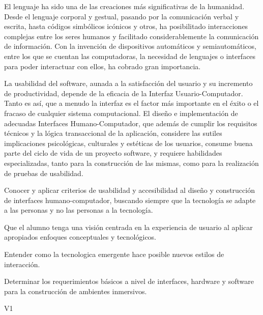 \begin{syllabus}


\begin{justification}
El lenguaje ha sido una de las creaciones más significativas de la humanidad. Desde el lenguaje corporal y gestual, 
pasando por la comunicación verbal y escrita, hasta códigos simbólicos icónicos y otros, ha posibilitado interacciones complejas 
entre los seres humanos y facilitado considerablemente la comunicación de información. 
Con la invención de dispositivos automáticos y semiautomáticos, entre los que se cuentan las computadoras, 
la necesidad de lenguajes o interfaces para poder interactuar con ellos, ha cobrado gran importancia. 

La usabilidad del software, aunada a la satisfacción del usuario y su incremento de productividad, depende de la eficacia de la Interfaz Usuario-Computador.
Tanto es así­, que a menudo la interfaz es el factor más importante en el éxito o el fracaso de cualquier sistema computacional. 
El diseño e implementación de adecuadas Interfaces Humano-Computador, que además de cumplir los requisitos técnicos y la 
lógica transaccional de la aplicación, considere las sutiles implicaciones psicológicas, culturales y estéticas de los usuarios, 
consume buena parte del ciclo de vida de un proyecto software, y requiere habilidades especializadas, 
tanto para la construcción de las mismas, como para la realización de pruebas de usabilidad.
\end{justification}

\begin{goals}
\item Conocer y aplicar criterios de usabilidad y accesibilidad al diseño y construcción de interfaces humano-computador, buscando siempre que la tecnología se adapte a las personas y no las personas a la tecnología.
\item Que el alumno tenga una visión centrada en la experiencia de usuario al aplicar apropiados enfoques conceptuales y tecnológicos.
\item Entender como la tecnologica emergente hace posible nuevos estilos de interacción. 
\item Determinar los requerimientos básicos a nivel de interfaces, hardware y software para la construcción de ambientes inmersivos.
\end{goals}

\begin{outcomes}{V1}
    \item {}
    \item {}
    \item {}
    \item {}
    \item {}
\end{outcomes}


\end{syllabus}
